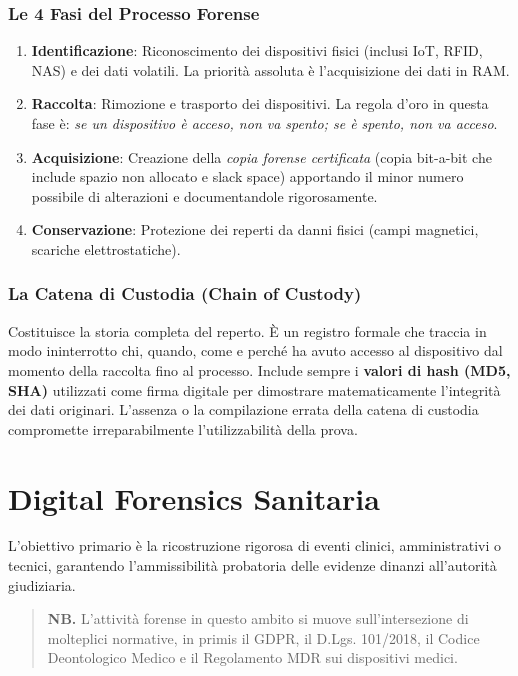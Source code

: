 \documentclass[11pt,a4paper]{article}
\begin{document}
\subsubsection{Le 4 Fasi del Processo Forense}
\begin{enumerate}
    \item \textbf{Identificazione}: Riconoscimento dei dispositivi fisici (inclusi IoT, RFID, NAS) e dei dati volatili. La priorità assoluta è l'acquisizione dei dati in RAM.
    \item \textbf{Raccolta}: Rimozione e trasporto dei dispositivi. La regola d'oro in questa fase è: \textit{se un dispositivo è acceso, non va spento; se è spento, non va acceso}.
    \item \textbf{Acquisizione}: Creazione della \textit{copia forense certificata} (copia bit-a-bit che include spazio non allocato e slack space) apportando il minor numero possibile di alterazioni e documentandole rigorosamente.
    \item \textbf{Conservazione}: Protezione dei reperti da danni fisici (campi magnetici, scariche elettrostatiche).
\end{enumerate}

\subsubsection{La Catena di Custodia (Chain of Custody)}
Costituisce la storia completa del reperto. È un registro formale che traccia in modo ininterrotto chi, quando, come e perché ha avuto accesso al dispositivo dal momento della raccolta fino al processo. Include sempre i \textbf{valori di hash (MD5, SHA)} utilizzati come firma digitale per dimostrare matematicamente l'integrità dei dati originari. L'assenza o la compilazione errata della catena di custodia compromette irreparabilmente l'utilizzabilità della prova.


\section{Digital Forensics Sanitaria}


L'obiettivo primario è la ricostruzione rigorosa di eventi clinici, amministrativi o tecnici, garantendo l'ammissibilità probatoria delle evidenze dinanzi all'autorità giudiziaria.

\begin{quote}
\textbf{NB.} L'attività forense in questo ambito si muove sull'intersezione di molteplici normative, in primis il GDPR, il D.Lgs. 101/2018, il Codice Deontologico Medico e il Regolamento MDR sui dispositivi medici.
\end{quote}
\end{document}
